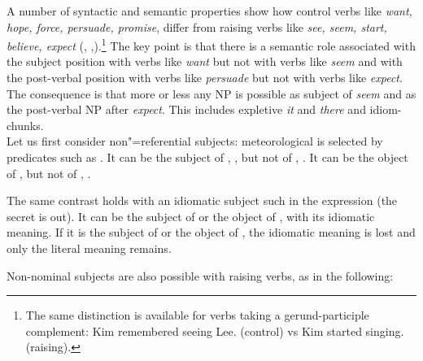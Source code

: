 \documentclass[output=paper
                ,modfonts
                ,nonflat
	        ,collection
	        ,collectionchapter
	        ,collectiontoclongg
 	        ,biblatex
                ,babelshorthands
                ,newtxmath
                ,draftmode
                ,colorlinks, citecolor=brown
]{./langsci/langscibook}
\begin{document}
 A number of syntactic and semantic properties show how control verbs like \emph{want, hope, force, persuade, promise}, differ from raising verbs like \emph{see, seem, start, believe, expect} (\citet{Rosenbaum1967}, \citet{Postal1974},\citet{Bresnan1982}).\footnote{The same distinction is available for verbs taking a gerund-participle complement:
Kim remembered seeing Lee. (control) vs  Kim started singing. (raising).}
 The key point is that there is a semantic role associated with the subject position with verbs like \emph{want} but not with verbs like \emph{seem} and with the post-verbal position with verbs like \emph{persuade} but not with verbs like \emph{expect}.  The consequence is that more or less any NP is possible as subject of \emph{seem} and as the post-verbal NP after \emph{expect}. This includes expletive \emph{it} and \emph{there} and idiom-chunks. \\
 Let us first consider non"=referential subjects: meteorological  is selected
 by predicates such as . It can be the subject of , , but not of
 , . It can be the object of ,  but not of , .
	
\eal
{}
 \label{rain1}
 \label{rain2}
\zl
\eal
{} \label{rain3}
 \label{rain4}
\zl
 	
 The same contrast holds with an idiomatic subject such  in the expression  (the secret is out). It can be the subject of  or the object of , with its idiomatic meaning. If it is the subject of  or the object of , the idiomatic meaning is lost and only the literal meaning remains.
 
\eal
\judgewidth{\#}
 \label{cat1}
 \label{cat2}
 \label{cat3}
 \label{cat4}
\zl

Non-nominal subjects are also possible with raising verbs, as in the following:
 
\eal 
{}
 \label{under}
\zl
\end{document}
